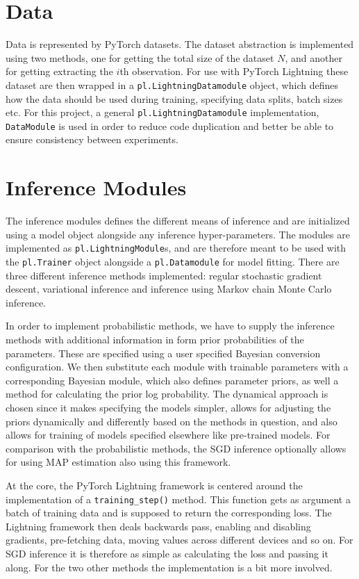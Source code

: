 \section{Data}
Data is represented by PyTorch datasets.
The dataset abstraction is implemented using two methods, one for getting the total size of the dataset $N$, and another for getting extracting the $i$th observation.
For use with PyTorch Lightning these dataset are then wrapped in a \texttt{pl.LightningDatamodule} object, which defines how the data should be used during training, specifying data splits, batch sizes etc.
For this project, a general \texttt{pl.LightningDatamodule} implementation, \texttt{DataModule} is used in order to reduce code duplication and better be able to ensure consistency between experiments. 

\section{Inference Modules}
The inference modules defines the different means of inference and are initialized using a model object alongside any inference hyper-parameters.
The modules are implemented as \texttt{pl.LightningModule}s, and are therefore meant to be used with the \texttt{pl.Trainer} object alongside a \texttt{pl.Datamodule} for model fitting. 
There are three different inference methods implemented: regular stochastic gradient descent, variational inference and inference using Markov chain Monte Carlo inference.

In order to implement probabilistic methods, we have to supply the inference methods with additional information in form prior probabilities of the parameters. 
These are specified using a user specified Bayesian conversion configuration.
We then substitute each module with trainable parameters with a corresponding Bayesian module, which also defines parameter priors, as well a method for calculating the prior log probability.
The dynamical approach is chosen since it makes specifying the models simpler, allows for adjusting the priors dynamically and differently based on the methods in question, and also allows for training of models specified elsewhere like pre-trained models. 
For comparison with the probabilistic methods, the SGD inference optionally allows for using MAP estimation also using this framework.

At the core, the PyTorch Lightning framework is centered around the implementation of a \texttt{training\_step()} method.
This function gets as argument a batch of training data and is supposed to return the corresponding loss.
The Lightning framework then deals backwards pass, enabling and disabling gradients, pre-fetching data, moving values across different devices and so on.
For SGD inference it is therefore as simple as calculating the loss and passing it along.
For the two other methods the implementation is a bit more involved.

